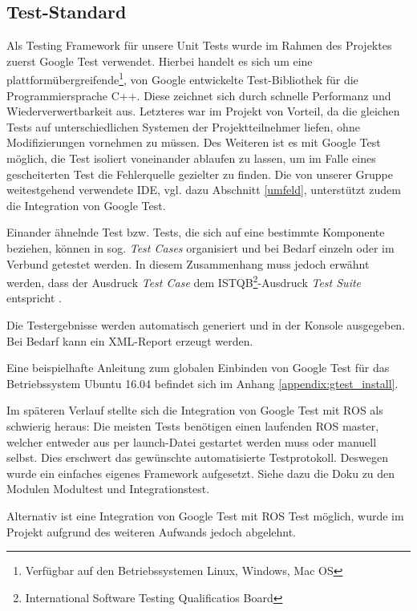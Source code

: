 \documentclass[a4paper, 12pt, titlepage]{scrartcl}
\begin{document}
		\subsection{Test-Standard}
		\label{test_standard}
		Als Testing Framework für unsere Unit Tests wurde im Rahmen des Projektes zuerst Google Test verwendet.
		Hierbei handelt es sich um eine plattformübergreifende\footnote{Verfügbar auf den Betriebssystemen Linux, Windows, Mac OS},
		von Google entwickelte Test-Bibliothek für die Programmiersprache C++. Diese zeichnet sich durch schnelle Performanz und
		Wiederverwertbarkeit aus. Letzteres war im Projekt von Vorteil, da die gleichen Tests auf unterschiedlichen Systemen der
		Projektteilnehmer liefen, ohne Modifizierungen vornehmen zu müssen. Des Weiteren ist es mit Google Test möglich, die Test
		isoliert voneinander ablaufen zu lassen, um im Falle eines gescheiterten Test die Fehlerquelle gezielter zu finden. Die von unserer Gruppe weitestgehend verwendete IDE, vgl. dazu Abschnitt \ref{umfeld}, unterstützt zudem die Integration von Google Test.

		Einander ähnelnde Test bzw. Tests, die sich auf eine bestimmte Komponente beziehen, können in sog. \emph{Test Cases}
		organisiert und bei Bedarf einzeln oder im Verbund getestet werden. In diesem Zusammenhang muss jedoch erwähnt werden,
		dass der Ausdruck \emph{Test Case} dem ISTQB\footnote{International Software Testing Qualificatios Board}-Ausdruck
		\emph{Test Suite} entspricht \cite{google}.

		Die Testergebnisse werden automatisch generiert und in der Konsole ausgegeben. Bei Bedarf kann ein XML-Report erzeugt werden.

		Eine beispielhafte Anleitung zum globalen Einbinden von Google Test für das Betriebssystem Ubuntu 16.04 befindet sich im Anhang \ref{appendix:gtest_install}.

		Im späteren Verlauf stellte sich die Integration von Google Test mit ROS als schwierig heraus: Die meisten Tests benötigen einen laufenden ROS master, welcher entweder aus per launch-Datei gestartet werden muss oder manuell selbst. Dies erschwert das gewünschte automatisierte Testprotokoll.	Deswegen wurde ein einfaches eigenes Framework aufgesetzt. Siehe dazu die Doku zu den Modulen Modultest und Integrationstest.

		Alternativ ist eine Integration von Google Test mit ROS Test möglich, wurde im Projekt aufgrund des weiteren Aufwands jedoch abgelehnt.

\end{document}
